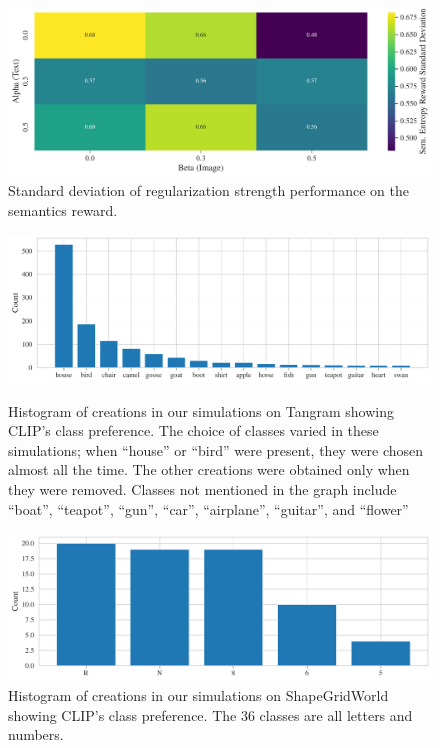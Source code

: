 \begin{figure}[h]
    \centering
    \includegraphics[width=\textwidth]{images/alpha_beta-semantics_std_rair.pdf}
    \vspace{-12pt}
    \caption{Standard deviation of regularization strength performance on the semantics reward.}
    \label{fig:alpha_beta-semantics_std_rair}
\end{figure}

\begin{figure}[H]
    \centering
    \includegraphics[width=\textwidth]{images/creations_distribution.pdf}
    \vspace{-12pt}
    \caption[Histogram of creations in our simulations on Tangram showing CLIP's class preference.]{Histogram of creations in our simulations on Tangram showing CLIP's class preference. The choice of classes varied in these simulations; when ``house'' or ``bird'' were present, they were chosen almost all the time. The other creations were obtained only when they were removed. Classes not mentioned in the graph include ``boat'', ``teapot'', ``gun'', ``car'', ``airplane'', ``guitar'', and ``flower''}
    \label{fig:class-preference-tangram}
    \vspace{12pt}
    \includegraphics[width=\textwidth]{images/creations_distribution_sgw.pdf}
    \vspace{-12pt}
    \caption[Histogram of creations in our simulations on ShapeGridWorld showing CLIP's class preference.]{Histogram of creations in our simulations on ShapeGridWorld showing CLIP's class preference. The \(36\) classes are all letters and numbers.}
    \label{fig:class-preference-sgw}
\end{figure}


